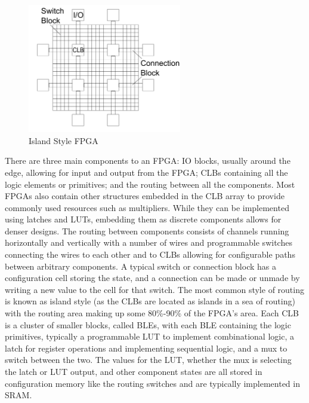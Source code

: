 \documentclass[12pt,final,oneside]{dwThesis} %
\begin{document}
   \begin{figure}

      \begin{center}

         \includegraphics[width=0.6\textwidth]{images/ArchFull.pdf}
         \caption{Island Style FPGA} \label{FPGAArch} 
      \end{center}

   \end{figure}


   There are three main components to an \gls{FPGA}: \gls{IO} blocks, usually
   around the edge, allowing for input and output from the \gls{FPGA};
   \glspl{CLB} containing all the logic elements or \glspl{primitive}; and the
   routing between all the components.  Most \glspl{FPGA} also contain other
   structures embedded in the \gls{CLB} array to provide commonly used
   resources such as multipliers. While they can be implemented using latches
   and \glspl{LUT}, embedding them as discrete components allows for denser
   designs.  The routing between components consists of channels running
   horizontally and vertically with a number of wires and programmable switches
   connecting the wires to each other and to \glspl{CLB} allowing for
   configurable paths between arbitrary components. A typical switch or
   connection block has a configuration cell storing the state, and a
   connection can be made or unmade by writing a new value to the cell for that
   switch. The most common style of routing is known as island style (as the
   \glspl{CLB} are located as islands in a sea of routing) with the routing
   area making up some 80\%-90\% of the \gls{FPGA}'s area\cite{FPGAArch}.  Each
   \gls{CLB} is a cluster of smaller blocks, called \glspl{BLE}, with each
   \gls{BLE} containing the logic primitives, typically a programmable
   \gls{LUT} to implement combinational logic, a latch for register operations
   and implementing sequential logic, and a \gls{mux} to switch between the
   two. The values for the \gls{LUT}, whether the \gls{mux} is selecting the
   latch or \gls{LUT} output, and other component states are all stored in
   configuration memory like the routing switches and are typically implemented
   in \gls{SRAM}.
\end{document}
